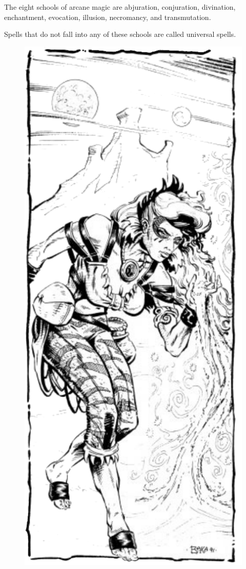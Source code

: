 The eight schools of arcane magic are abjuration, conjuration, divination, enchantment, evocation, illusion, necromancy, and transmutation.

Spells that do not fall into any of these schools are called universal spells.

\begin{figure}[t!]
\centering
\includegraphics[width=\columnwidth]{images/wizard-2.png}
\end{figure}


